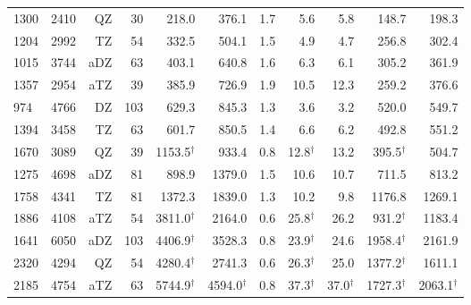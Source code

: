 \begin{table}[H]
\begin{tabular}{lrrrrrrrrrr}
1300& 2410&    QZ&    30&               218.0 &              376.1&     1.7 &                5.6 &                5.8&               148.7&               198.3\\
1204& 2992&    TZ&    54&               332.5 &              504.1&     1.5 &                4.9 &                4.7&               256.8&               302.4\\
1015& 3744&   aDZ&    63&               403.1 &              640.8&     1.6 &                6.3 &                6.1&               305.2&               361.9\\
1357& 2954&   aTZ&    39&               385.9 &              726.9&     1.9 &               10.5 &               12.3&               259.2&               376.6\\
 974& 4766&    DZ&   103&               629.3 &              845.3&     1.3 &                3.6 &                3.2&               520.0&               549.7\\
1394& 3458&    TZ&    63&               601.7 &              850.5&     1.4 &                6.6 &                6.2&               492.8&               551.2\\
1670& 3089&    QZ&    39&  1153.5$^{\dagger}$ &              933.4&     0.8 &   12.8$^{\dagger}$ &               13.2&   395.5$^{\dagger}$&               504.7\\
1275& 4698&   aDZ&    81&               898.9 &             1379.0&     1.5 &               10.6 &               10.7&               711.5&               813.2\\
1758& 4341&    TZ&    81&              1372.3 &             1839.0&     1.3 &               10.2 &                9.8&              1176.8&              1269.1\\
1886& 4108&   aTZ&    54&  3811.0$^{\dagger}$ &             2164.0&     0.6 &   25.8$^{\dagger}$ &               26.2&   931.2$^{\dagger}$&              1183.4\\
1641& 6050&   aDZ&   103&  4406.9$^{\dagger}$ &             3528.3&     0.8 &   23.9$^{\dagger}$ &               24.6&  1958.4$^{\dagger}$&              2161.9\\
2320& 4294&    QZ&    54&  4280.4$^{\dagger}$ &             2741.3&     0.6 &   26.3$^{\dagger}$ &               25.0&  1377.2$^{\dagger}$&              1611.1\\
2185& 4754&   aTZ&    63&  5744.9$^{\dagger}$ & 4594.0$^{\dagger}$&     0.8 &   37.3$^{\dagger}$ &   37.0$^{\dagger}$&  1727.3$^{\dagger}$&  2063.1$^{\dagger}$\\

\end{tabular}
\end{table}
